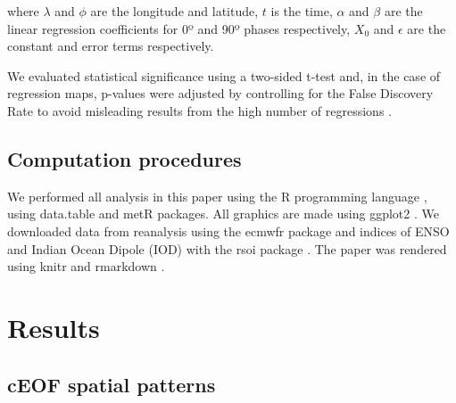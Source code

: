 \documentclass[pdflatex,lineno,sn-basic]{sn-jnl}
\theoremstyle{thmstyleone}%
\theoremstyle{thmstyletwo}%
\theoremstyle{thmstylethree}%
\begin{document}
where \(\lambda\) and \(\phi\) are the longitude and latitude, \(t\) is the time, \(\alpha\) and \(\beta\) are the linear regression coefficients for 0º and 90º phases respectively, \(X_0\) and \(\epsilon\) are the constant and error terms respectively.

We evaluated statistical significance using a two-sided t-test and, in the case of regression maps, p-values were adjusted by controlling for the False Discovery Rate \citep{benjamini1995, wilks2016} to avoid misleading results from the high number of regressions \citep{walker1914, katz1991}.

\hypertarget{computation-procedures}{%
\subsection{Computation procedures}\label{computation-procedures}}

We performed all analysis in this paper using the R programming language \citep{rcoreteam2020}, using data.table \citep{dowle2020} and metR \citep{campitelli2020} packages.
All graphics are made using ggplot2 \citep{wickham2009}.
We downloaded data from reanalysis using the ecmwfr package \citep{hufkens2020} and indices of ENSO and Indian Ocean Dipole (IOD) with the rsoi package \citep{albers2020}.
The paper was rendered using knitr and rmarkdown \citep{xie2015, allaire2020}.

\hypertarget{results}{%
\section{Results}\label{results}}

\hypertarget{spatial}{%
\subsection{cEOF spatial patterns}\label{spatial}}
\end{document}
